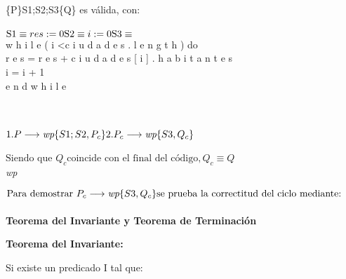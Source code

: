 \documentclass[10pt,a4paper]{article}
\begin{document}

 \\
\{P\}S1;S2;S3\{Q\}\; \text es válida, con: \\
\vspace{0.1cm}  \\
$\text{S1} \equiv res:= 0 \\
	\text{S2} \equiv i:=0 \\
	\text{S3} \equiv $\\
w h i l e ( i \textless c i u d a d e s . l e n g t h ) do \\
r e s = r e s + c i u d a d e s [ i ] . h a b i t a n t e s \\
i = i + 1 \\
e n d w h i l e \\

\vspace{0.1cm}

 \\
\vspace {0.1cm} \\
$1. P \longrightarrow \textit{wp} \{S1;S2,P_{c}\} \\
	2. P_{c} \longrightarrow \textit{wp}\{S3,Q_{c}\}$ \\
\vspace {0.1cm} \\

$ \text{Siendo que } Q_{c}  \text{coincide con el final del código},  Q_{c} \equiv Q $\\
 \implica \textit{wp}

\vspace{0.3cm}

$\text{Para demostrar } P_{c} \longrightarrow \textit{wp} \{{S3,Q_{c}\}} \text{se prueba la correctitud del ciclo mediante:}$ \\
\vspace*{1cm} \\
\textbf{Teorema del Invariante y Teorema de Terminación}


\textbf{Teorema del Invariante:}

Si existe un predicado I tal que:
\end{document}
